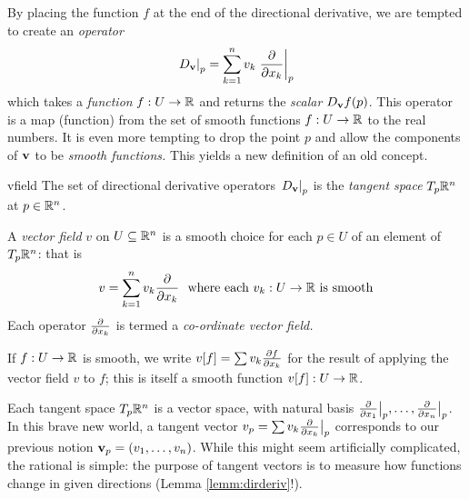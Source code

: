 \goodbreak


By placing the function $f$ at the end of the directional derivative, we are tempted to create an \emph{operator}
\[
	\at{D_\vv}{p}=\sum_{k=1}^nv_k\partialsat{x_k}{p}
\]
which takes a \emph{function} $f:U\to\R$ and returns the \emph{scalar} $D_\vv f(p)$.
This operator is a map (function) from the set of smooth functions $f:U\to\R$ to the real numbers. It is even more tempting to drop the point $p$ and allow the components of $\vv$ to be \emph{smooth functions.} This yields a new definition of an old concept.

\begin{defn}{}{vfield}
	The set of directional derivative operators $\at{D_\vv}{p}$ is the \emph{tangent space} $T_p\R^n$ at $p\in\R^n$.\par
	A \emph{vector field} $v$ on $U\subseteq\R^n$ is a smooth choice for each $p\in U$ of an element of $T_p\R^n$: that is
	\[
		v=\sum_{k=1}^nv_k\partials{x_k}\ \text{ where each $v_k:U\to\R$ is smooth}
	\]
	Each operator $\partials{x_k}$ is termed a \emph{co-ordinate vector field.}\par
	If $f:U\to\R$ is smooth, we write $v[f]=\sum v_k\partials[f]{x_k}$ for the result of applying the vector field $v$ to $f$; this is itself a smooth function $v[f]:U\to\R$.
\end{defn}

Each tangent space $T_p\R^n$ is a vector space, with natural basis $\smash[b]{\partials{x_1}\big|_p,\ldots,\partials{x_n}\big|_p}$. In this brave new world, a tangent vector $v_p=\sum v_k\partials{x_k}\big|_p$ corresponds to our previous notion $\vv_p=(v_1,\ldots,v_n)$. While this might seem artificially complicated, the rational is simple: the purpose of tangent vectors is to measure how functions change in given directions (Lemma \ref{lemm:dirderiv}!).


